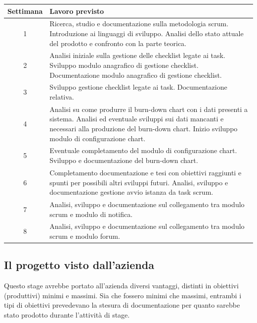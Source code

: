 \begin{tabular}{| c | p{10cm} |}

\hline
\textbf{Settimana} & \textbf{Lavoro previsto} \\
\hline
1 & Ricerca, studio e documentazione sulla metodologia scrum. Introduzione
    ai linguaggi di sviluppo. Analisi dello stato attuale del prodotto e
    confronto con la parte teorica. \\
\hline
2 & Analisi iniziale sulla gestione delle checklist legate ai task.
    Sviluppo modulo anagrafico di gestione checklist. Documentazione modulo
    anagrafico di gestione checklist. \\
\hline
3 & Sviluppo gestione checklist legate ai task. Documentazione relativa. \\
\hline
4 & Analisi su come produrre il burn-down chart con i dati presenti a
    sistema. Analisi ed eventuale sviluppi sui dati mancanti e necessari
    alla produzione del burn-down chart. Inizio sviluppo modulo di
    configurazione chart. \\
\hline
5 & Eventuale completamento del modulo di configurazione chart. Sviluppo e
    documentazione del burn-down chart. \\
\hline
6 & Completamento documentazione e tesi con obiettivi raggiunti e spunti
    per possibili altri sviluppi futuri. Analisi, sviluppo e
    documentazione gestione avvio istanza da task scrum. \\
\hline
7 & Analisi, sviluppo e documentazione sul collegamento tra modulo scrum e
    modulo di notifica. \\
\hline
8 & Analisi, sviluppo e documentazione sul collegamento tra modulo scrum e
    modulo forum. \\
\hline
\end{tabular}
\label{tab:piano-di-lavoro}

\subsection{Il progetto visto dall'azienda}\label{sec:strat-ob-prod}

Questo stage avrebbe portato all'azienda diversi vantaggi, distinti in
obiettivi (produttivi) minimi e massimi. Sia che fossero minimi che massimi,
entrambi i tipi di obiettivi prevedevano la stesura di documentazione per
quanto sarebbe stato prodotto durante l'attività di stage.


